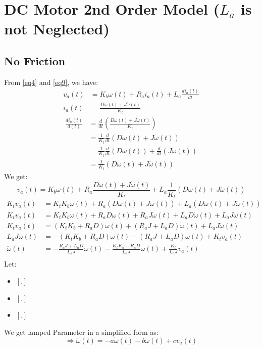 \documentclass[12pt,a4paper]{article}
\begin{document}
	\section{DC Motor 2nd Order Model ($ L_a $ is not Neglected)}
	\subsection{No Friction}
	From \autoref{eq4} and \autoref{eq9}, we have:
	\[\begin{split}
		v_a(t) &= K_b \omega(t) + R_a i_a(t) + L_a \frac{di_a(t)}{dt} \\
		i_a(t) &= \frac{D\omega(t) + J \dot{\omega}(t)}{K_t}
	\end{split}\]
	\[\begin{split}
		\frac{di_a(t)}{d(t)} &= \frac{d}{dt}\left(\frac{D\omega(t) + J \dot{\omega}(t)}{K_t}\right) \\
		&= \frac{1}{K_t}\frac{d}{dt}(D\omega(t) + J \dot{\omega}(t))\\
		&= \frac{1}{K_t} \frac{d}{dt}(D\omega(t)) + \frac{d}{dt}(J \dot{\omega}(t)) \\
		&= \frac{1}{K_t} (D\dot{\omega}(t) + J \ddot{\omega}(t))
	\end{split}\]
	We get:
	\begin{equation}
		v_a(t) = K_b \omega(t) + R_a \frac{D\omega(t) + J \dot{\omega}(t)}{K_t} + L_a\frac{1}{K_t} (D\dot{\omega}(t) + J \ddot{\omega}(t))
		\label{eq15}
	\end{equation}
	\[\begin{split}
		K_tv_a(t) &= K_tK_b \omega(t) + R_a (D\omega(t) + J \dot{\omega}(t)) + L_a (D\dot{\omega}(t) + J \ddot{\omega}(t)) \\
		K_tv_a(t) &= K_tK_b \omega(t) + R_a D\omega(t) + R_a J \dot{\omega}(t) + L_a D\dot{\omega}(t) + L_aJ \ddot{\omega}(t) \\
		K_tv_a(t) &= (K_tK_b + R_a D) \omega(t) + (R_a J + L_a D) \dot{\omega}(t) + L_aJ \ddot{\omega}(t) \\
		L_aJ \ddot{\omega}(t) &= -(K_tK_b + R_a D) \omega(t) - (R_a J + L_a D) \dot{\omega}(t) + K_tv_a(t) \\
		\ddot{\omega}(t) &= - \frac{R_a J + L_a D}{L_aJ} \dot{\omega}(t) -\frac{K_tK_b + R_a D}{L_aJ} \omega(t)  + \frac{K_t}{L_aJ}v_a(t) \\
	\end{split}\]
	Let:
	\begin{itemize}
		\item { \([.]\) }
		\item { \([.]\) }
		\item { \([.]\) }
	\end{itemize}
	We get lamped Parameter in a simplified form as:
	\begin{equation}
		\Rightarrow \boxed{\ddot{\omega}(t) = - a\dot{\omega}(t) - b\omega(t) + cv_a(t)}
		\label{eq16}
	\end{equation}
\end{document}
